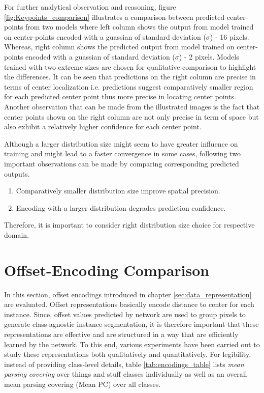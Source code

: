 For further analytical observation and reasoning, figure \ref{fig:Keypoints_comparison} illustrates a comparison between predicted center-points from two models where left column shows the output from model trained on center-points encoded with a guassian of standard deviation ($\sigma$) - 16 pixels. Whereas, right column shows the predicted output from model trained on center-points encoded with a guassian of standard deviation ($\sigma$) - 2 pixels. Models trained with two extreme sizes are chosen for qualitative comparison to highlight the differences. It can be seen that predictions on the right column are precise in terms of center localization i.e. predictions suggest comparatively smaller region for each predicted center point thus more precise in locating center points. Another observation that can be made from the illustrated images is the fact that center points shown on the right column are not only precise in term of space but also exhibit a relatively higher confidence for each center point.

Although a larger distribution size might seem to have greater influence on training and might lead to a faster convergence in some cases, following two important observations can be made by comparing corresponding predicted outputs.

\begin{enumerate}
    \item Comparatively smaller distribution size improve spatial precision. 
    \item Encoding with a larger distribution degrades prediction confidence.
\end{enumerate}

Therefore, it is important to consider right distribution size choice for respective domain.


\section{Offset-Encoding Comparison}


In this section, offset encodings introduced in chapter \ref{sec:data_representation} are evaluated.
Offset representations basically encode distance to center for each instance. Since, offset values predicted by network are used to group pixels to generate class-agnostic instance segmentation, it is therefore important that these representations are effective and are structured in a way that are efficiently learned by the network. To this end, various experiments have been carried out to study these representations both qualitatively and quantitatively. For legibility, instead of providing class-level details, table \ref{tab:encodings_table} lists \textit{ mean parsing covering} over things and stuff classes individually as well as an overall mean parsing covering (Mean PC) over all classes.

